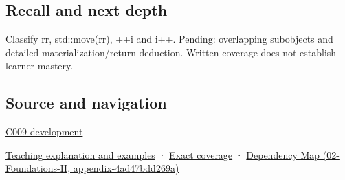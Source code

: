 \subsection{Recall and next depth}\label{appendix-1121b30eaeb0-recall-and-next-depth}

Classify rr, std::move(rr), ++i and i++. Pending: overlapping subobjects and detailed materialization/return deduction. Written coverage does not establish learner mastery.

\subsection{Source and navigation}\label{appendix-1121b30eaeb0-source-and-navigation}

\hyperref[appendix-fd090d982a15-m009---parts-127-147]{C009 development}

\hyperref[01-foundations-i-ch003-an-expression-has-a-type-and-a-category]{Teaching explanation and examples} · \hyperref[appendix-fd090d982a15-m008---parts-113-126]{Exact coverage} · \href{../02-Foundations-II/main.pdf\#nameddest=appendix-4ad47bdd269a}{Dependency Map (02-Foundations-II, appendix-4ad47bdd269a)}
